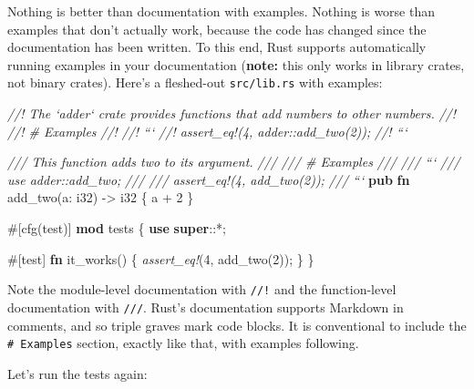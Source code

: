 \documentclass[a4paper,]{book}
\newenvironment{Shaded}{\begin{snugshade}}{\end{snugshade}}
\newcommand{\KeywordTok}[1]{\textcolor[rgb]{0.13,0.29,0.53}{\textbf{{#1}}}}
\newcommand{\DataTypeTok}[1]{\textcolor[rgb]{0.13,0.29,0.53}{{#1}}}
\newcommand{\DecValTok}[1]{\textcolor[rgb]{0.00,0.00,0.81}{{#1}}}
\newcommand{\CommentTok}[1]{\textcolor[rgb]{0.56,0.35,0.01}{\textit{{#1}}}}
\newcommand{\PreprocessorTok}[1]{\textcolor[rgb]{0.56,0.35,0.01}{\textit{{#1}}}}
\newcommand{\AttributeTok}[1]{\textcolor[rgb]{0.77,0.63,0.00}{{#1}}}
\newcommand{\NormalTok}[1]{{#1}}
\begin{document}
Nothing is better than documentation with examples. Nothing is worse
than examples that don't actually work, because the code has changed
since the documentation has been written. To this end, Rust supports
automatically running examples in your documentation (\textbf{note:}
this only works in library crates, not binary crates). Here's a
fleshed-out \texttt{src/lib.rs} with examples:

\begin{Shaded}
\begin{Highlighting}[]
\CommentTok{//! The `adder` crate provides functions that add numbers to other numbers.}
\CommentTok{//!}
\CommentTok{//! # Examples}
\CommentTok{//!}
\CommentTok{//! ```}
\CommentTok{//! assert_eq!(4, adder::add_two(2));}
\CommentTok{//! ```}

\CommentTok{/// This function adds two to its argument.}
\CommentTok{///}
\CommentTok{/// # Examples}
\CommentTok{///}
\CommentTok{/// ```}
\CommentTok{/// use adder::add_two;}
\CommentTok{///}
\CommentTok{/// assert_eq!(4, add_two(2));}
\CommentTok{/// ```}
\KeywordTok{pub} \KeywordTok{fn} \NormalTok{add_two(a: }\DataTypeTok{i32}\NormalTok{) -> }\DataTypeTok{i32} \NormalTok{\{}
    \NormalTok{a + }\DecValTok{2}
\NormalTok{\}}

\AttributeTok{#[}\NormalTok{cfg}\AttributeTok{(}\NormalTok{test}\AttributeTok{)]}
\KeywordTok{mod} \NormalTok{tests \{}
    \KeywordTok{use} \KeywordTok{super}\NormalTok{::*;}

    \AttributeTok{#[}\NormalTok{test}\AttributeTok{]}
    \KeywordTok{fn} \NormalTok{it_works() \{}
        \PreprocessorTok{assert_eq!}\NormalTok{(}\DecValTok{4}\NormalTok{, add_two(}\DecValTok{2}\NormalTok{));}
    \NormalTok{\}}
\NormalTok{\}}
\end{Highlighting}
\end{Shaded}

Note the module-level documentation with \texttt{//!} and the
function-level documentation with \texttt{///}. Rust's documentation
supports Markdown in comments, and so triple graves mark code blocks. It
is conventional to include the \texttt{\#\ Examples} section, exactly
like that, with examples following.

Let's run the tests again:
\end{document}
